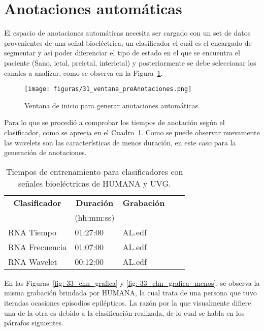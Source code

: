 \section{Anotaciones automáticas}
El espacio de anotaciones automáticas necesita ser cargado con un set de datos provenientes de una señal bioeléctrica; un clasificador el cuál es el encargado de segmentar y así poder diferenciar el tipo de estado en el que se encuentra el paciente (Sano, ictal, preictal, interictal) y posteriormente se debe seleccionar los canales a analizar, como se observa en la Figura~\ref{fig: pre_anotaciones_ventana}. 

\begin{figure}[H]
    \centering
    \texttt{[image: figuras/31\_ventana\_preAnotaciones.png]}
    \caption{Ventana de inicio para generar anotaciones automáticas.}
    \label{fig: pre_anotaciones_ventana}
\end{figure}

Para lo que se procedió a comprobar los tiempos de anotación según el clasificador, como se aprecia en el Cuadro~\ref{cuadro:Duracion anotaciones}. Como se puede observar nuevamente las wavelets son las características de menos duración, en este caso para la generación de anotaciones. 

\begin{table}[H]
\begin{center}
\begin{tabular}{|l|l|l|l|l|}
\hline
    \multicolumn{1}{|c|}{\textbf{Clasificador}} & \multicolumn{1}{c|}{\textbf{Duración }} & \multicolumn{1}{c|}{\textbf{Grabación }} \\ %
          & (hh:mm:ss) & \\ \hline
    RNA Tiempo   & 01:27:00  & AL.edf   \\ \hline
    RNA Frecuencia& 01:07:00  & AL.edf   \\ \hline
    RNA Wavelet   & 00:12:00  & AL.edf   \\ \hline
\end{tabular}
\caption[Tiempos de entrenamiento para clasificadores]{Tiempos de entrenamiento para clasificadores con señales bioeléctricas de HUMANA y UVG.} 
\label{cuadro:Duracion anotaciones}
\end{center}
\end{table}

En las Figuras~\ref{fig: 33_chn_grafica} y \ref{fig: 33_chn_grafica_menos}, se observa la misma grabación brindada por HUMANA, la cual trata de una persona que tuvo iteradas ocasiones episodios epilépticos. La razón por la que visualmente difiere una de la otra es debido a la clasificación realizada, de lo cual se habla en los párrafos siguientes. 


